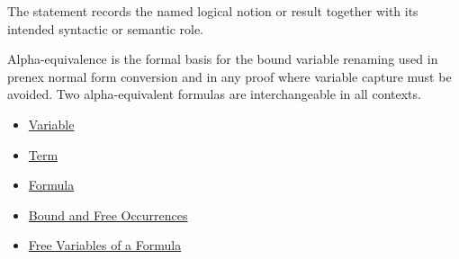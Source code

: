 \begin{remark*}[Interpretation]
The statement records the named logical notion or result together with its
intended syntactic or semantic role.
\end{remark*}


\begin{remark*}[Exposition]
Alpha-equivalence is the formal basis for the bound variable renaming used
in prenex normal form conversion and in any proof where variable capture must
be avoided. Two alpha-equivalent formulas are interchangeable in all contexts.
\end{remark*}

\begin{dependencies}
\begin{itemize}
  \item \hyperref[def:variable]{Variable}
  \item \hyperref[def:term]{Term}
  \item \hyperref[def:formula]{Formula}
  \item \hyperref[def:bound-free]{Bound and Free Occurrences}
  \item \hyperref[def:fv]{Free Variables of a Formula}
\end{itemize}
\end{dependencies}
